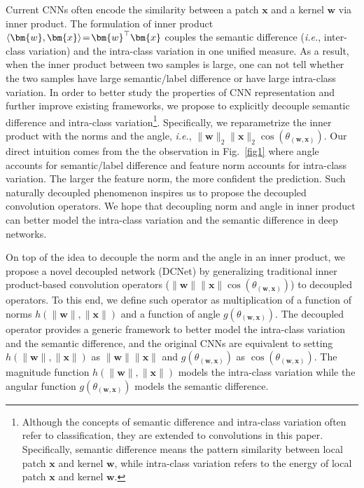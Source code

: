\par
Current CNNs often encode the similarity between a patch $\bm{x}$ and a kernel $\bm{w}$ via inner product. The formulation of inner product $\thickmuskip=2mu \medmuskip=2mu \langle \bm{w},\bm{x}\rangle=\bm{w}^\top\bm{x}$ couples the semantic difference (\emph{i.e.}, inter-class variation) and the intra-class variation in one unified measure. As a result, when the inner product between two samples is large, one can not tell whether the two samples have large semantic/label difference or have large intra-class variation. In order to better study the properties of CNN representation and further improve existing frameworks, we propose to explicitly decouple semantic difference and intra-class variation\footnote{Although the concepts of semantic difference and intra-class variation often refer to classification, they are extended to convolutions in this paper. Specifically, semantic difference means the pattern similarity between local patch $\bm{x}$ and kernel $\bm{w}$, while intra-class variation refers to the energy of local patch $\bm{x}$ and kernel $\bm{w}$.}. Specifically, we reparametrize the inner product with the norms and the angle, \emph{i.e.}, $\|\bm{w}\|_2\|\bm{x}\|_2\cos(\theta_{(\bm{w},\bm{x})})$. Our direct intuition comes from the the observation in Fig.~\ref{fig1} where angle accounts for semantic/label difference and feature norm accounts for intra-class variation. The larger the feature norm, the more confident the prediction. Such naturally decoupled phenomenon inspires us to propose the decoupled convolution operators. We hope that decoupling norm and angle in inner product can better model the intra-class variation and the semantic difference in deep networks.
\par
On top of the idea to decouple the norm and the angle in an inner product, we propose a novel decoupled network (DCNet) by generalizing traditional inner product-based convolution operators ($\|\bm{w}\|\|\bm{x}\|\cos(\theta_{(\bm{w},\bm{x})})$) to decoupled operators. To this end, we define such operator as multiplication of a function of norms $h(\|\bm{w}\|,\|\bm{x}\|)$ and a function of angle $g(\theta_{(\bm{w},\bm{x})})$. The decoupled operator provides a generic framework to better model the intra-class variation and the semantic difference, and the original CNNs are equivalent to setting $h(\|\bm{w}\|,\|\bm{x}\|)$ as $\|\bm{w}\|\|\bm{x}\|$ and $g(\theta_{(\bm{w},\bm{x})})$ as $\cos(\theta_{(\bm{w},\bm{x})})$. The magnitude function $h(\|\bm{w}\|,\|\bm{x}\|)$ models the intra-class variation while the angular function $g(\theta_{(\bm{w},\bm{x})})$ models the semantic difference.
